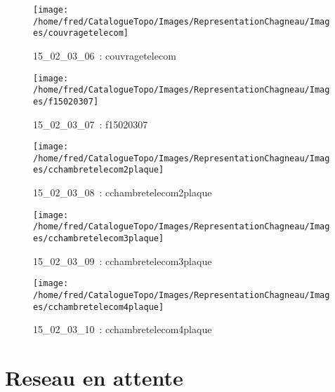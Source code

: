 \documentclass[12pt,titlepage]{book}
\begin{document}
\begin{figure}[h!]
\begin{minipage}[t]{3cm}
    \begin{center}
      \texttt{[image: /home/fred/CatalogueTopo/Images/RepresentationChagneau/Images/couvragetelecom]}
      \caption[~15\_02\_03\_06]{\small{15\_02\_03\_06~:} \tiny{couvragetelecom}}\label{couvragetelecom}
    \end{center}
  \end{minipage}
  \begin{minipage}[t]{3cm}
    \begin{center}
      \texttt{[image: /home/fred/CatalogueTopo/Images/RepresentationChagneau/Images/f15020307]}
      \caption[~15\_02\_03\_07]{\small{15\_02\_03\_07~:} \tiny{f15020307}}\label{f15020307}
    \end{center}
  \end{minipage}
  \begin{minipage}[t]{3cm}
    \begin{center}
      \texttt{[image: /home/fred/CatalogueTopo/Images/RepresentationChagneau/Images/cchambretelecom2plaque]}
      \caption[~15\_02\_03\_08]{\small{15\_02\_03\_08~:} \tiny{cchambretelecom2plaque}}\label{cchambretelecom2plaque}
    \end{center}
  \end{minipage}
  \begin{minipage}[t]{3cm}
    \begin{center}
      \texttt{[image: /home/fred/CatalogueTopo/Images/RepresentationChagneau/Images/cchambretelecom3plaque]}
      \caption[~15\_02\_03\_09]{\small{15\_02\_03\_09~:} \tiny{cchambretelecom3plaque}}\label{cchambretelecom3plaque}
    \end{center}
  \end{minipage}
  \begin{minipage}[t]{3cm}
    \begin{center}
      \texttt{[image: /home/fred/CatalogueTopo/Images/RepresentationChagneau/Images/cchambretelecom4plaque]}
      \caption[~15\_02\_03\_10]{\small{15\_02\_03\_10~:} \tiny{cchambretelecom4plaque}}\label{cchambretelecom4plaque}
    \end{center}
  \end{minipage}
\end{figure}
\chapter{Reseau en attente}
\end{document}
